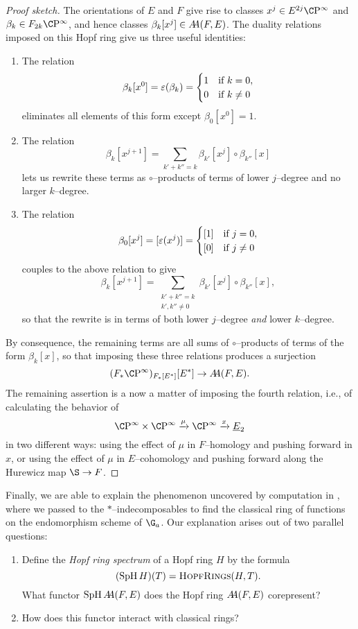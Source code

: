 \begin{proof}[Proof sketch]
The orientations of \(E\) and \(F\) give rise to classes \(x^j \in E^{2j} \CP^\infty\) and \(\beta_k \in F_{2k} \CP^\infty\), and hence classes \(\beta_k[x^j] \in \AA(F, E)\).  The duality relations imposed on this Hopf ring give us three useful identities:
\begin{enumerate}
    \item The relation \[\beta_k[x^0] = \eps(\beta_k) = \begin{cases} 1 & \text{if \(k = 0\)}, \\ 0 & \text{if \(k \ne 0\)}\end{cases}\] eliminates all elements of this form except \(\beta_0[x^0] = 1\).
    \item The relation \[\beta_k[x^{j+1}] = \sum_{k' + k'' = k} \beta_{k'}[x^j] \circ \beta_{k''}[x]\] lets us rewrite these terms as \(\circ\)--products of terms of lower \(j\)--degree and no larger \(k\)--degree.
    \item The relation \[\beta_0[x^j] = [\eps(x^j)] = \begin{cases} [1] & \text{if \(j = 0\)}, \\ [0] & \text{if \(j \ne 0\)}\end{cases}\] couples to the above relation to give \[\beta_k[x^{j+1}] = \sum_{\substack{k' + k'' = k \\ k', k'' \ne 0}} \beta_{k'}[x^j] \circ \beta_{k''}[x],\] so that the rewrite is in terms of both lower \(j\)--degree \emph{and} lower \(k\)--degree.
\end{enumerate}
By consequence, the remaining terms are all sums of \(\circ\)--products of terms of the form \(\beta_k[x]\), so that imposing these three relations produces a surjection \[(F_* \CP^\infty)_{F_*[E^*]}[E^*] \to \AA(F, E).\]  The remaining assertion is a now a matter of imposing the fourth relation, i.e., of calculating the behavior of \[\CP^\infty \times \CP^\infty \xrightarrow{\mu} \CP^\infty \xrightarrow{x} \OS{E}{2}\] in two different ways: using the effect of \(\mu\) in \(F\)--homology and pushing forward in \(x\), or using the effect of \(\mu\) in \(E\)--cohomology and pushing forward along the Hurewicz map \(\S \to F\).
\end{proof}



Finally, we are able to explain the phenomenon uncovered by computation in , where we passed to the \(\ast\)--indecomposables to find the classical ring of functions on the endomorphism scheme of \(\G_a\).  Our explanation arises out of two parallel questions:
\begin{enumerate}
	\item Define the \textit{Hopf ring spectrum} of a Hopf ring \(H\) by the formula \[(\SpH H)(T) = \CatOf{HopfRings}(H, T).\]  What functor \(\SpH \AA(F, E)\) does the Hopf ring \(\AA(F, E)\) corepresent?
	\item How does this functor interact with classical rings?
\end{enumerate}


